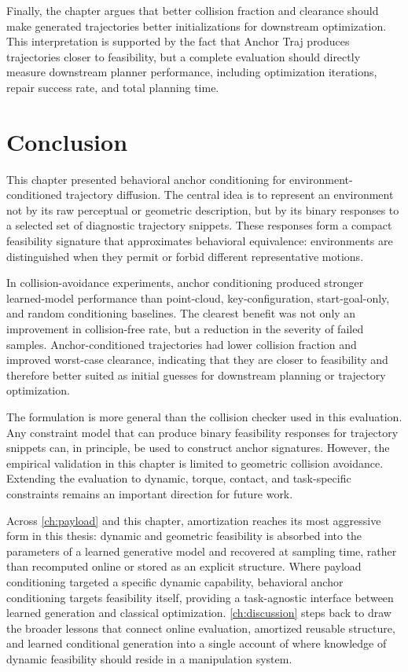 Finally, the chapter argues that better collision fraction and clearance should make generated trajectories better initializations for downstream optimization. This interpretation is supported by the fact that Anchor Traj produces trajectories closer to feasibility, but a complete evaluation should directly measure downstream planner performance, including optimization iterations, repair success rate, and total planning time.

\section{Conclusion}\label{sec:anchor-conclusion}

This chapter presented behavioral anchor conditioning for environment-conditioned trajectory diffusion. The central idea is to represent an environment not by its raw perceptual or geometric description, but by its binary responses to a selected set of diagnostic trajectory snippets. These responses form a compact feasibility signature that approximates behavioral equivalence: environments are distinguished when they permit or forbid different representative motions.

In collision-avoidance experiments, anchor conditioning produced stronger learned-model performance than point-cloud, key-configuration, start-goal-only, and random conditioning baselines. The clearest benefit was not only an improvement in collision-free rate, but a reduction in the severity of failed samples. Anchor-conditioned trajectories had lower collision fraction and improved worst-case clearance, indicating that they are closer to feasibility and therefore better suited as initial guesses for downstream planning or trajectory optimization.

The formulation is more general than the collision checker used in this evaluation. Any constraint model that can produce binary feasibility responses for trajectory snippets can, in principle, be used to construct anchor signatures. However, the empirical validation in this chapter is limited to geometric collision avoidance. Extending the evaluation to dynamic, torque, contact, and task-specific constraints remains an important direction for future work.

Across \cref{ch:payload} and this chapter, amortization reaches its most aggressive form in this thesis: dynamic and geometric feasibility is absorbed into the parameters of a learned generative model and recovered at sampling time, rather than recomputed online or stored as an explicit structure.
Where payload conditioning targeted a specific dynamic capability, behavioral anchor conditioning targets feasibility itself, providing a task-agnostic interface between learned generation and classical optimization.
\cref{ch:discussion} steps back to draw the broader lessons that connect online evaluation, amortized reusable structure, and learned conditional generation into a single account of where knowledge of dynamic feasibility should reside in a manipulation system.
